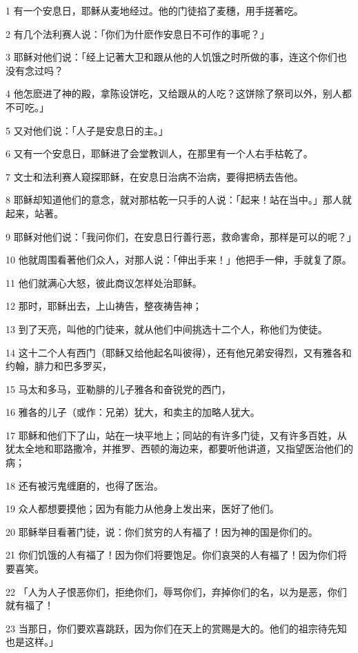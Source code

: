 \par 1 有一个安息日，耶稣从麦地经过。他的门徒掐了麦穗，用手搓著吃。
\par 2 有几个法利赛人说：「你们为什麽作安息日不可作的事呢？」
\par 3 耶稣对他们说：「经上记著大卫和跟从他的人饥饿之时所做的事，连这个你们也没有念过吗？
\par 4 他怎麽进了神的殿，拿陈设饼吃，又给跟从的人吃？这饼除了祭司以外，别人都不可吃。」
\par 5 又对他们说：「人子是安息日的主。」
\par 6 又有一个安息日，耶稣进了会堂教训人，在那里有一个人右手枯乾了。
\par 7 文士和法利赛人窥探耶稣，在安息日治病不治病，要得把柄去告他。
\par 8 耶稣却知道他们的意念，就对那枯乾一只手的人说：「起来！站在当中。」那人就起来，站著。
\par 9 耶稣对他们说：「我问你们，在安息日行善行恶，救命害命，那样是可以的呢？」
\par 10 他就周围看著他们众人，对那人说：「伸出手来！」他把手一伸，手就复了原。
\par 11 他们就满心大怒，彼此商议怎样处治耶稣。
\par 12 那时，耶稣出去，上山祷告，整夜祷告神；
\par 13 到了天亮，叫他的门徒来，就从他们中间挑选十二个人，称他们为使徒。
\par 14 这十二个人有西门（耶稣又给他起名叫彼得），还有他兄弟安得烈，又有雅各和约翰，腓力和巴多罗买，
\par 15 马太和多马，亚勒腓的儿子雅各和奋锐党的西门，
\par 16 雅各的儿子（或作：兄弟）犹大，和卖主的加略人犹大。
\par 17 耶稣和他们下了山，站在一块平地上；同站的有许多门徒，又有许多百姓，从犹太全地和耶路撒冷，并推罗、西顿的海边来，都要听他讲道，又指望医治他们的病；
\par 18 还有被污鬼缠磨的，也得了医治。
\par 19 众人都想要摸他；因为有能力从他身上发出来，医好了他们。
\par 20 耶稣举目看著门徒，说：你们贫穷的人有福了！因为神的国是你们的。
\par 21 你们饥饿的人有福了！因为你们将要饱足。你们哀哭的人有福了！因为你们将要喜笑。
\par 22 「人为人子恨恶你们，拒绝你们，辱骂你们，弃掉你们的名，以为是恶，你们就有福了！
\par 23 当那日，你们要欢喜跳跃，因为你们在天上的赏赐是大的。他们的祖宗待先知也是这样。」

